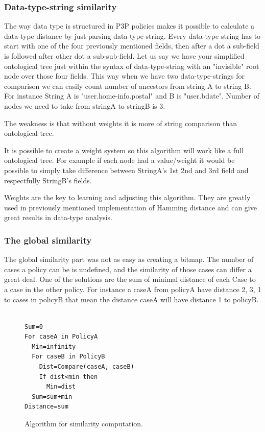 \subsubsection{Data-type-string similarity}
The way data type is structured in P3P policies makes it possible to calculate a data-type distance by just parsing data-type-string. Every data-type string has to start with one of the four previously mentioned fields, then after a dot a sub-field is followed after other dot a sub-sub-field. Let us say we have your simplified ontological tree just within the syntax of data-type-string with an "invisible" root node over those four fields. This way when we have two data-type-strings for comparison we can easily count number of ancestors from string A to string B. For instance String A is "user.home-info.postal" and B is "user.bdate". Number of nodes we need to take from stringA to stringB is 3. 

The weakness is that without weights it is more of string comparison than ontological tree.

It is possible to create a weight system so this algorithm will work like a full ontological tree. For example if each node had a value/weight it would be possible to simply take difference between StringA's 1st 2nd and 3rd field and respectfully StringB's fields.
 
Weights are the key to learning and adjusting this algorithm. They are greatly used in previously mentioned implementation of Hamming distance and can give great results in data-type analysis.

\subsubsection{ The global similarity }
The global similarity part was not as easy as creating a bitmap. The number of cases a policy can be is undefined, and the similarity of those cases can differ a great deal. One of the solutions are the sum of minimal distance of each Case to a case in the other policy. For instance a caseA from policyA have distance 2, 3, 1 to cases in policyB that mean the distance caseA will have distance 1 to policyB. 

\begin{figure}[htpb]

\begin{verbatim}

Sum=0
For caseA in PolicyA
  Min=infinity
  For caseB in PolicyB
    Dist=Compare(caseA, caseB)
    If dist<min then
      Min=dist
  Sum=sum+min
Distance=sum
\end{verbatim}

  \caption{Algorithm for similarity computation.}
  \label{similAlgo}
\end{figure}
 

